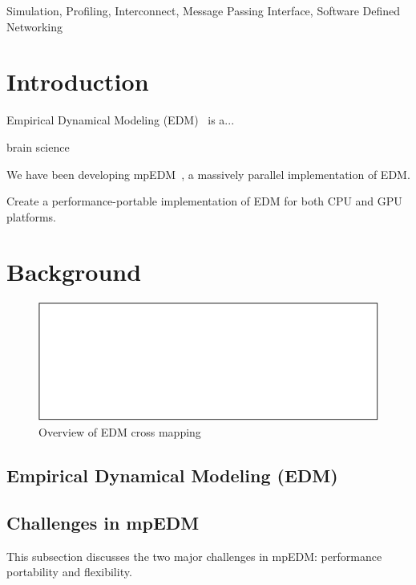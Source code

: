 \documentclass[conference]{IEEEtran}
\begin{document}
\begin{IEEEkeywords} Simulation, Profiling, Interconnect, Message Passing Interface, Software
    Defined Networking
\end{IEEEkeywords}

\section{Introduction}

Empirical Dynamical Modeling (EDM)~\cite{Chang2017} is a...

\cite{Ma2017}

brain science~\cite{Natsukawa2017}

We have been developing mpEDM~\cite{mpedm}, a massively parallel
implementation of EDM.

Create a performance-portable implementation of EDM for both CPU and GPU
platforms.

\clearpage

\section{Background}

\begin{figure}
    \centering
    \includegraphics{figs/xmap_overview}
    \caption{Overview of EDM cross mapping}%
    \label{fig:architecture}
\end{figure}

\subsection{Empirical Dynamical Modeling (EDM)}

\subsection{Challenges in mpEDM}

This subsection discusses the two major challenges in mpEDM: performance
portability and flexibility.
\end{document}
